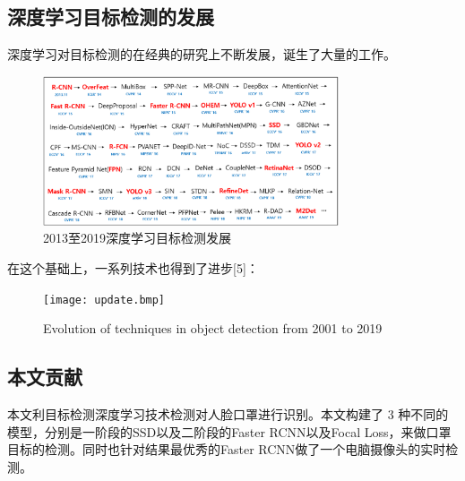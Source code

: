 \documentclass[journal,transmag]{IEEEtran}
\begin{document}
\subsection{深度学习目标检测的发展}
深度学习对目标检测的在经典的研究上不断发展，诞生了大量的工作。
\begin{figure}[h]
\centering
\includegraphics[width=3.44in]{list.bmp}
\caption{2013至2019深度学习目标检测发展}
\end{figure}

在这个基础上，一系列技术也得到了进步[5]：
\begin{figure}[h]
\centering
\texttt{[image: update.bmp]}
\caption{Evolution of techniques in object detection from 2001 to 2019}
\end{figure}

\subsection{本文贡献}
本文利目标检测深度学习技术检测对人脸口罩进行识别。本文构建了 3 种不同的模型，分别是一阶段的SSD以及二阶段的Faster RCNN以及Focal Loss，来做口罩目标的检测。同时也针对结果最优秀的Faster RCNN做了一个电脑摄像头的实时检测。
\end{document}
